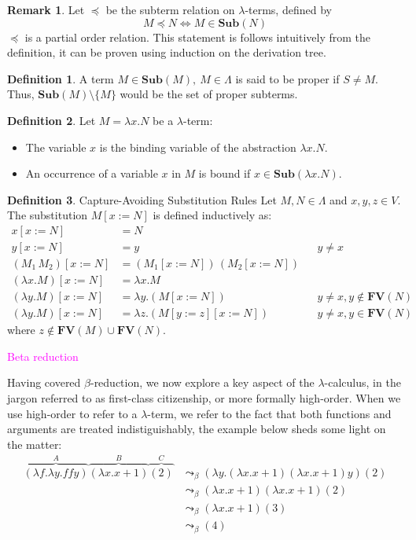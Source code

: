 \documentclass[12pt]{book}
\newcommand{\la}{\lambda}
\newcommand{\La}{\Lambda}
\newcommand{\Vset}{V}
\newcommand{\lcalc}{$\la$-calculus}
\newcommand{\bred}{$\beta$-reduction}
\newcommand{\lterm}{$\la$-term}
\newcommand{\lterms}{$\la$-terms}
\newcommand{\magenta}[1]{\textcolor{magenta}{#1}}
\newcommand{\functionfont}[1]{\mathbf{#1}}
\newcommand{\curly}{\mathrel{\leadsto}_\beta}
\newcommand{\Sub}[1]{\functionfont{Sub}(#1)}
\newcommand{\FV}[1]{\functionfont{FV}(#1)}
\theoremstyle{plain}
\theoremstyle{definition}
\newtheorem{definition}{Definition}[section]
\theoremstyle{definition}
\theoremstyle{definition}
\newtheorem{remark}{Remark}
\begin{document}
\begin{remark}
  Let \( \preceq \) be the subterm relation on \lterms, defined by
  \[
    M \preceq N \iff M \in \Sub{ N }
  \]
  \( \preceq \) is a partial order relation. This statement is follows intuitively from the definition, it can be proven using induction on the derivation tree.
\end{remark}
\begin{definition} A term $M \in \Sub M, \ M \in \Lambda$ is said to be proper if $S \neq M$. Thus, $\Sub{M} \setminus \{M\}$ would be the set of proper subterms.
\end{definition}
\begin{definition} Let \( M = \lambda x. N \) be a \lterm:
\begin{itemize}
\item The variable \( x \) is the binding variable of the abstraction \( \lambda x. N \).
  \item An occurrence of a variable \( x \) in \( M \) is bound if \( x \in \Sub { \lambda x. N } \).
  \end{itemize}
\end{definition}

\begin{definition}Capture-Avoiding Substitution Rules
  Let \( M, N \in \La \) and \( x, y, z \in \Vset \). The substitution \( M[x := N] \) is defined inductively as:
  \[
    \begin{aligned}
      x[x := N]                       & = N \\
      y[x := N]                       & = y && y \neq x \\
      (M_1\, M_2)[x := N]             & = (M_1[x := N])\,(M_2[x := N]) \\
      (\lambda x. M)[x := N]          & = \lambda x. M \\
      (\lambda y. M)[x := N]          & = \lambda y. (M[x := N]) && y \neq x, y \notin \FV { N } \\
      (\lambda y. M)[x := N]          & = \lambda z. (M[y := z][x := N]) && y \neq x, y \in \FV { N }
    \end{aligned}
  \]
  where \( z \notin \FV { M } \cup \FV { N } \).
\end{definition}

\magenta{Beta reduction}

\newpage
Having covered \bred, we now explore a key aspect of the \lcalc, in the jargon referred to as first-class citizenship, or more formally high-order. When we use high-order to refer to a $\la$-term, we refer to the fact that both functions and arguments are treated indistiguishably, the example below sheds some light on the matter:
\begin{align*}
  \overbrace { (\lambda f . \lambda y . f f y) }^{A} \overbrace{ (\lambda x . x + 1) }^{B} \overbrace{(2)}^{C}
  &\curly (\lambda y .(\lambda x . x + 1) (\lambda x . x + 1)y)(2) \\
  &\curly (\lambda x . x + 1)(\lambda x . x + 1)(2) \\
  &\curly (\lambda x . x + 1) (3) \\
  &\curly (4)
\end{align*}
\end{document}
